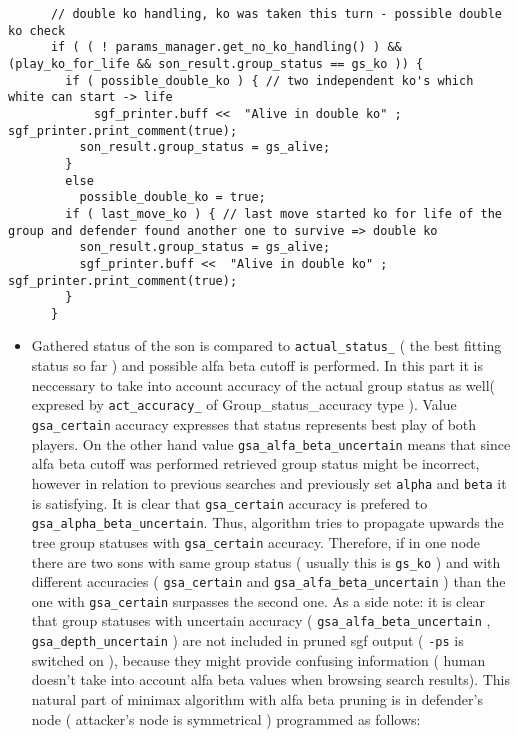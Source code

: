 \footnotesize\begin{verbatim}      // double ko handling, ko was taken this turn - possible double ko check  
      if ( ( ! params_manager.get_no_ko_handling() ) && (play_ko_for_life && son_result.group_status == gs_ko )) { 
        if ( possible_double_ko ) { // two independent ko's which white can start -> life
            sgf_printer.buff <<  "Alive in double ko" ; sgf_printer.print_comment(true);
          son_result.group_status = gs_alive;
        }
        else 
          possible_double_ko = true;
        if ( last_move_ko ) { // last move started ko for life of the group and defender found another one to survive => double ko
          son_result.group_status = gs_alive;
          sgf_printer.buff <<  "Alive in double ko" ; sgf_printer.print_comment(true);
        }
      }
\end{verbatim}
\normalsize


\label{invalid_invalid}
\begin{itemize}
\item Gathered status of the son is compared to {\tt actual\_\-status\_\-} ( the best fitting status so far ) and possible alfa beta cutoff is performed. In this part it is neccessary to take into account accuracy of the actual group status as well( expresed by {\tt act\_\-accuracy\_\-} of Group\_\-status\_\-accuracy type ). Value {\tt gsa\_\-certain} accuracy expresses that status represents best play of both players. On the other hand value {\tt gsa\_\-alfa\_\-beta\_\-uncertain} means that since alfa beta cutoff was performed retrieved group status might be incorrect, however in relation to previous searches and previously set {\tt alpha} and {\tt beta} it is satisfying. It is clear that {\tt gsa\_\-certain} accuracy is prefered to {\tt gsa\_\-alpha\_\-beta\_\-uncertain}. Thus, algorithm tries to propagate upwards the tree group statuses with {\tt gsa\_\-certain} accuracy. Therefore, if in one node there are two sons with same group status ( usually this is {\tt gs\_\-ko} ) and with different accuracies ( {\tt gsa\_\-certain} and {\tt gsa\_\-alfa\_\-beta\_\-uncertain} ) than the one with {\tt gsa\_\-certain} surpasses the second one. As a side note: it is clear that group statuses with uncertain accuracy ( {\tt gsa\_\-alfa\_\-beta\_\-uncertain} , {\tt gsa\_\-depth\_\-uncertain} ) are not included in pruned sgf output ( {\tt -ps} is switched on ), because they might provide confusing information ( human doesn't take into account alfa beta values when browsing search results). This natural part of minimax algorithm with alfa beta pruning is in defender's node ( attacker's node is symmetrical ) programmed as follows:\end{itemize}




